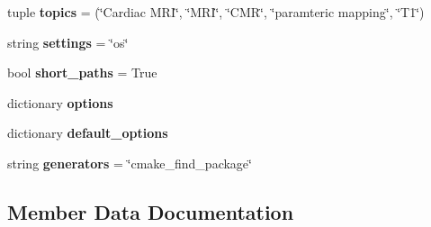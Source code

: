 \begin{DoxyCompactItemize}
\item 
tuple {\bfseries topics} = (\char`\"{}Cardiac M\+RI\char`\"{}, \char`\"{}M\+RI\char`\"{}, \char`\"{}C\+MR\char`\"{}, \char`\"{}paramteric mapping\char`\"{}, \char`\"{}T1\char`\"{})\hypertarget{classconanfile_1_1_tomato_conan_ae313448f5395ee58ba9a85a7ca82c23c}{}\label{classconanfile_1_1_tomato_conan_ae313448f5395ee58ba9a85a7ca82c23c}

\item 
string {\bfseries settings} = \char`\"{}os\char`\"{}\hypertarget{classconanfile_1_1_tomato_conan_a6d2ca4c580877cac66ca1341ca2ca85a}{}\label{classconanfile_1_1_tomato_conan_a6d2ca4c580877cac66ca1341ca2ca85a}

\item 
bool {\bfseries short\+\_\+paths} = True\hypertarget{classconanfile_1_1_tomato_conan_a963c532fc8be673d7f60c73ec8a77585}{}\label{classconanfile_1_1_tomato_conan_a963c532fc8be673d7f60c73ec8a77585}

\item 
dictionary {\bfseries options}
\item 
dictionary {\bfseries default\+\_\+options}
\item 
string {\bfseries generators} = \char`\"{}cmake\+\_\+find\+\_\+package\char`\"{}\hypertarget{classconanfile_1_1_tomato_conan_af526159a57c62a54d1b00aa7b6b16e1a}{}\label{classconanfile_1_1_tomato_conan_af526159a57c62a54d1b00aa7b6b16e1a}

\end{DoxyCompactItemize}


\subsection{Member Data Documentation}

